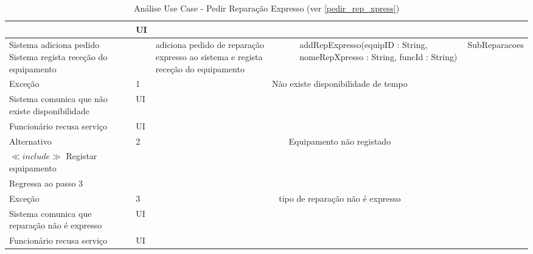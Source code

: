 \documentclass[../relatorio.tex]{subfiles}
\begin{document}
\begin{landscape}
\begin{table}[!h]
\begin{tabular}{|p{5cm}|p{1cm}|p{4cm}|p{6cm}|p{3cm}|}
                     & UI
                     & 
                     & 
                     & 
            \\
            \hline
            Sistema adiciona pedido
            Sistema regista receção do equipamento
                     & 
                     & adiciona pedido de reparação expresso ao sistema e regista receção do equipamento
                     & addRepExpresso(equipID : String, nomeRepXpresso : String, funcId : String)
                     & SubReparacoes
            \\
            \hline
            \rowcolor{red!30}
            Exceção  & 1                                               &  \multicolumn{3}{c}{Não existe disponibilidade de tempo}\\
            \hline
            \rowcolor{yellow}
            Sistema comunica que não existe disponibilidade
                     & UI
                     & 
                     & 
                     & 
            \\
            \hline
            Funcionário recusa serviço
                     & UI
                     & 
                     & 
                     & 
            \\
            \hline
            \rowcolor{green!30}
            Alternativo  & 2                                               &  \multicolumn{3}{c}{Equipamento não registado}\\
            \hline
            $\ll include \gg$ Registar equipamento
                     & 
                     & 
                     & 
                     & 
            \\
            \hline
            Regressa ao passo 3
                     & 
                     & 
                     & 
                     & 
            \\
            \hline
            \rowcolor{red!30}
            Exceção  & 3                                               &  \multicolumn{3}{c}{tipo de reparação não é expresso}\\
            \hline
            \rowcolor{yellow}
            Sistema comunica que reparação não é expresso
                     & UI
                     & 
                     & 
                     & 
            \\
            \hline
            Funcionário recusa serviço
                     & UI
                     & 
                     & 
                     & 
            \\
            \hline
        \end{tabular}
        \caption{Análise Use Case - Pedir Reparação Expresso (ver \ref{pedir_rep_xpress})}
    \end{table}
\end{landscape}
\end{document}

